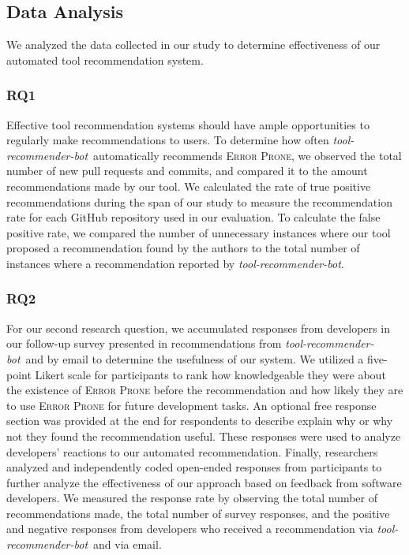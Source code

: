 \documentclass[sigconf,review,anonymous]{acmart}
\newcommand{\tool}{\textsl{tool-recommender-bot}}
\begin{document}
\subsection{Data Analysis}

We analyzed the data collected in our study to determine effectiveness of our automated tool recommendation system.

\subsubsection{RQ1}

Effective tool recommendation systems should have ample opportunities to regularly make recommendations to users. To determine how often \tool~automatically recommends \textsc{Error Prone}, we observed the total number of new pull requests and commits, and compared it to the amount recommendations made by our tool. We calculated the rate of true positive recommendations during the span of our study to measure the recommendation rate for each GitHub repository used in our evaluation. To calculate the false positive rate, we compared the number of unnecessary instances where our tool proposed a recommendation found by the authors to the total number of instances where a recommendation reported by \tool.

\subsubsection{RQ2}

For our second research question, we accumulated responses from developers in our follow-up survey presented in recommendations from \tool~and by email to determine the usefulness of our system. We utilized a five-point Likert scale for participants to rank how knowledgeable they were about the existence of \textsc{Error Prone} before the recommendation and how likely they are to use \textsc{Error Prone} for future development tasks. An optional free response section was provided at the end for respondents to describe explain why or why not they found the recommendation useful. These responses were used to analyze developers' reactions to our automated recommendation. Finally, researchers analyzed and independently coded open-ended responses from participants to further analyze the effectiveness of our approach based on feedback from software developers. We measured the response rate by observing the total number of recommendations made, the total number of survey responses, and the positive and negative responses from developers who received a recommendation via \tool~and via email.
\end{document}
